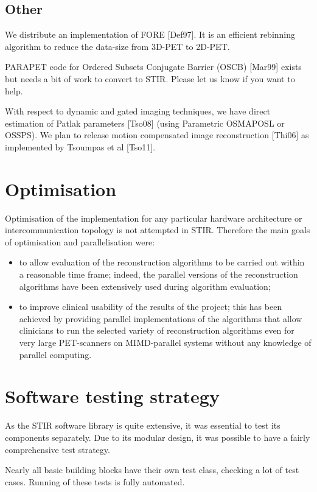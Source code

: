 \documentclass{article}
\begin{document}
\subsection{Other}

We distribute an implementation of FORE  [Def97]. It is an efficient 
rebinning algorithm to reduce the data-size from 3D-PET to 2D-PET. 

PARAPET code for 
Ordered Subsets Conjugate Barrier (OSCB) [Mar99] exists but needs
a bit of work to convert to STIR. Please let us know if you 
want to help.
 
With respect to dynamic and gated imaging
techniques, we have direct estimation of Patlak
parameters [Tso08] (using Parametric OSMAPOSL or OSSPS).
We plan to release motion compensated image reconstruction [Thi06] as
implemented by Tsoumpas et al [Tso11].

\section{
Optimisation}

Optimisation of the implementation for any particular hardware 
architecture or intercommunication topology is not attempted 
in STIR. Therefore the main goals of optimisation and parallelisation 
were:
\begin{itemize}
\item to allow evaluation of the reconstruction algorithms to be 
carried out within a reasonable time frame; indeed, the parallel 
versions of the reconstruction algorithms have been extensively 
used during algorithm evaluation;
\item to improve clinical usability of the results of the project; 
this has been achieved by providing parallel implementations 
of the algorithms that allow clinicians to run the selected variety 
of reconstruction algorithms even for very large PET-scanners 
on MIMD-parallel systems without any knowledge of parallel computing.
\end{itemize}


\section{
Software testing strategy}

As the STIR software library is quite extensive, it was essential 
to test its components separately. Due to its modular design, 
it was possible to have a fairly comprehensive test strategy.

Nearly all basic building blocks have their own test class, checking 
a lot of test cases. Running of these tests is fully automated.
\end{document}
